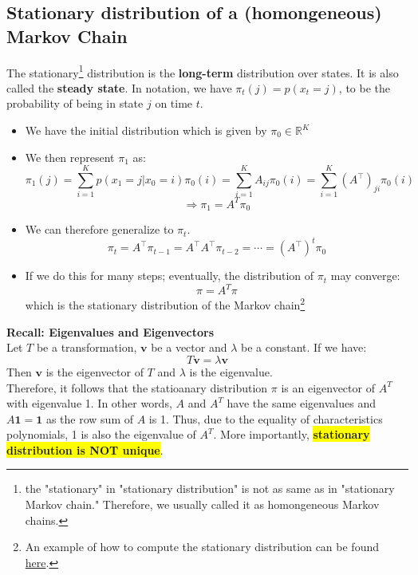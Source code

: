 \subsection{Stationary distribution of a (homongeneous) Markov Chain}
The stationary\footnote{the "stationary" in "stationary distribution" is not as same as in "stationary Markov chain." Therefore, we usually called it as homongeneous Markov chains.} distribution is the \textbf{long-term} distribution over states. It is also called the \textbf{steady state}. In notation, we have $\pi_t(j)=p(x_t=j)$, to be the probability of being in state $j$ on time $t$.\\
\begin{itemize}
    \item We have the initial distribution which is given by $\pi_0\in\mathbb{R}^{K}$
    \item We then represent $\pi_1$ as:
    $$\pi_1(j)=\sum_{i=1}^K p\left(x_1=j | x_0=i\right) \pi_0(i)=\sum_{i=1}^K A_{i j} \pi_0(i)=\sum_{i=1}^K\left(A^{\top}\right)_{j i} \pi_0(i)$$
    $$\Rightarrow \pi_1=A^T\pi_0$$
    \item We can therefore generalize to $\pi_t$.
    $$\pi_t=A^{\top} \pi_{t-1}=A^{\top} A^{\top} \pi_{t-2}=\cdots=\left(A^{\top}\right)^t \pi_0$$
    \item If we do this for many steps; eventually, the distribution of $\pi_t$ may converge:
    $$\pi=A^T\pi$$
    which is the stationary distribution of the Markov chain\footnote{An example of how to compute the stationary distribution can be found \hyperref[sec:example-stationary]{here}.}
\end{itemize}

\textbf{Recall: Eigenvalues and Eigenvectors}\\
Let $T$ be a transformation, $\mathbf{v}$ be a vector and $\lambda$ be a constant. If we have:
$$T\mathbf{v}=\lambda\mathbf{v}$$
Then $\mathbf{v}$ is the eigenvector of $T$ and $\lambda$ is the eigenvalue.\\

Therefore, it follows that the statioanary distribution $\pi$ is an eigenvector of $A^T$ with eigenvalue 1. In other words, $A$ and $A^T$ have the same eigenvalues and $A\mathbf{1}=\mathbf{1}$ as the row sum of $A$ is 1. Thus, due to the equality of characteristics polynomials, 1 is also the eigenvalue of $A^T$. More importantly, \colorbox{yellow}{\textbf{stationary distribution is NOT unique}}.\\
